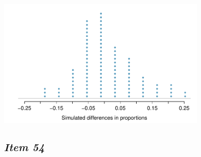 \begin{center}
\includegraphics[width = 0.78\textwidth]{includes/heartTr_RandHist} \\
\end{center}

\subsection{\textbf{\textit{Item 54}}}


